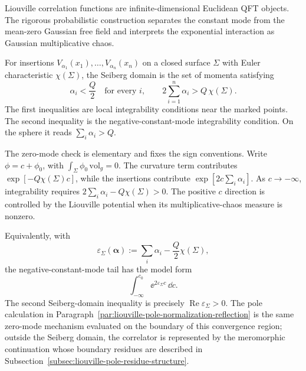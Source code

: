 Liouville correlation functions are infinite-dimensional Euclidean QFT
objects.  The rigorous probabilistic construction separates the constant mode
from the mean-zero Gaussian free field and interprets the exponential
interaction as Gaussian multiplicative chaos.

\begin{definition}
\label{def:liouville-seiberg-domain}
\label{def:seiberg-domain-in-physics-normalization}
For insertions \(V_{\alpha_1}(x_1),\ldots,V_{\alpha_n}(x_n)\) on a closed
surface \(\Sigma\) with Euler characteristic \(\chi(\Sigma)\), the Seiberg
domain is the set of momenta satisfying
\begin{equation}
  \alpha_i<\frac Q2\quad\text{for every }i,
  \qquad
  2\sum_{i=1}^n\alpha_i>Q\,\chi(\Sigma).
  \label{eq:liouville-seiberg-bound}
\end{equation}
The first inequalities are local integrability conditions near the marked
points.  The second inequality is the negative-constant-mode integrability
condition.  On the sphere it reads \(\sum_i\alpha_i>Q\).
\end{definition}

The zero-mode check is elementary and fixes the sign conventions.  Write
\(\phi=c+\phi_0\), with \(\int_\Sigma\phi_0\,\mathrm{vol}_g=0\).  The
curvature term contributes \(\exp[-Q\chi(\Sigma)c]\), while the insertions
contribute \(\exp[2c\sum_i\alpha_i]\).  As \(c\to-\infty\), integrability
requires \(2\sum_i\alpha_i-Q\chi(\Sigma)>0\).  The positive \(c\) direction
is controlled by the Liouville potential when its multiplicative-chaos
measure is nonzero.

Equivalently, with
\[
  \varepsilon_\Sigma(\boldsymbol\alpha)
  :=
  \sum_i\alpha_i-\frac Q2\chi(\Sigma),
\]
the negative-constant-mode tail has the model form
\[
  \int_{-\infty}^{c_0}\ee^{2\varepsilon_\Sigma c}\,\dd c .
\]
The second Seiberg-domain inequality is precisely
\(\operatorname{Re}\varepsilon_\Sigma>0\).  The pole calculation in
Paragraph~\ref{par:liouville-pole-normalization-reflection} is the same
zero-mode mechanism evaluated on the boundary of this convergence region;
outside the Seiberg domain, the correlator is represented by the meromorphic
continuation whose boundary residues are described in
Subsection~\ref{subsec:liouville-pole-residue-structure}.

